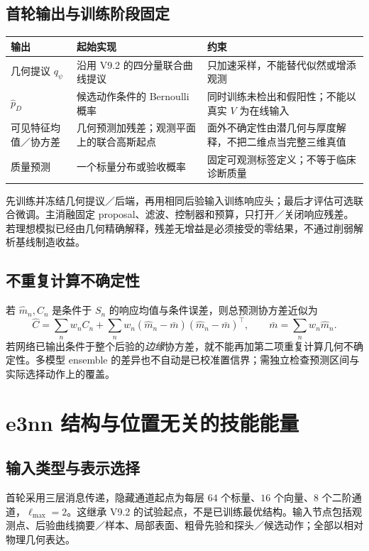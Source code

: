 \documentclass[UTF8,fontset=fandol,11pt,a4paper]{ctexart}
\theoremstyle{plain}
\theoremstyle{definition}
\theoremstyle{remark}
\numberwithin{equation}{section}
\begin{document}
\subsection{首轮输出与训练阶段固定}
\begin{table}[htbp]\centering\small
\begin{tabularx}{\linewidth}{P{29mm}YY}\toprule
输出 & 起始实现 & 约束\\\midrule
几何提议 $q_\psi$ & 沿用 V9.2 的四分量联合曲线提议 & 只加速采样，不能替代似然或增添观测\\
$\widehat p_D$ & 候选动作条件的 Bernoulli 概率 & 同时训练未检出和假阳性；不能以真实 $V$ 为在线输入\\
可见特征均值／协方差 & 几何预测加残差；观测平面上的联合高斯起点 & 面外不确定性由潜几何与厚度解释，不把二维点当完整三维真值\\
质量预测 & 一个标量分布或验收概率 & 固定可观测标签定义；不等于临床诊断质量\\\bottomrule
\end{tabularx}
\end{table}

先训练并冻结几何提议／后端，再用相同后验输入训练响应头；最后才评估可选联合微调。主消融固定 proposal、滤波、控制器和预算，只打开／关闭响应残差。若理想模拟已经由几何精确解释，残差无增益是必须接受的零结果，不通过削弱解析基线制造收益。

\subsection{不重复计算不确定性}
若 $\widehat m_n,C_n$ 是条件于 $S_n$ 的响应均值与条件误差，则总预测协方差近似为
\begin{equation}
\widehat C=\sum_n w_n C_n+
\sum_n w_n(\widehat m_n-\bar m)(\widehat m_n-\bar m)^\top,
\qquad\bar m=\sum_nw_n\widehat m_n.
\label{eq:totalcov}
\end{equation}
若网络已输出条件于整个后验的\emph{边缘}协方差，就不能再加第二项重复计算几何不确定性。多模型 ensemble 的差异也不自动是已校准置信界；需独立检查预测区间与实际选择动作上的覆盖。

\section{e3nn 结构与位置无关的技能能量}
\label{sec:e3nn}
\subsection{输入类型与表示选择}
首轮采用三层消息传递，隐藏通道起点为每层 $64$ 个标量、$16$ 个向量、$8$ 个二阶通道，$\ell_{\max}=2$。这继承 V9.2 的试验起点，不是已训练最优结构。输入节点包括观测点、后验曲线摘要／样本、局部表面、粗骨先验和探头／候选动作；全部以相对物理几何表达。
\end{document}
